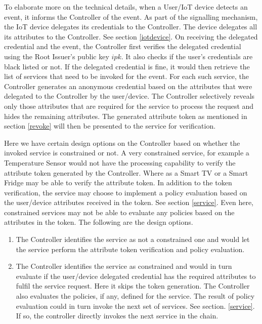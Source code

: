 \documentclass[journal]{IEEEtran}
\begin{document}
To elaborate more on the technical details, when a User/IoT device detects an event, it informs the Controller of the event. As part of the signalling mechanism, the IoT device delegates its credentials to the Controller. The device delegates all its attributes to the Controller. See section \ref{iotdevice}. On receiving the delegated credential and the event, the Controller first verifies the delegated credential using the Root Issuer's public key $ipk$. It also checks if the user's credentials are black listed or not. If the delegated credential is fine, it would then retrieve the list of services that need to be invoked for the event. For each such service, the Controller generates an anonymous credential based on the attributes that were delegated to the Controller by the user/device. The Controller selectively reveals only those attributes that are required for the service to process the request and hides the remaining attributes. The generated attribute token as mentioned in section \ref{revoke} will then be presented to the service for verification.

Here we have certain design options on the Controller based on whether the invoked service is constrained or not. A very constrained service, for example a Temperature Sensor would not have the processing capability to verify the attribute token generated by the Controller. Where as a Smart TV or a Smart Fridge may be able to verify the attribute token. In addition to the token verification, the service may choose to implement a policy evaluation based on the user/device attributes received in the token. See section \ref{service}. Even here, constrained services may not be able to evaluate any policies based on the attributes in the token. The following are the design options.

\begin{enumerate}[label=\alph*)]
	\item The Controller identifies the service as not a constrained one and would let the service perform the attribute token verification and policy evaluation.
	\item The Controller identifies the service as constrained and would in turn evaluate if the user/device delegated credential has the required attributes to fulfil the service request. Here it skips the token generation. The Controller also evaluates the policies, if any, defined for the service. The result of policy evaluation could in turn invoke the next set of services. See section. \ref{service}. If so, the controller directly invokes the next service in the chain.
\end{enumerate}
\end{document}
